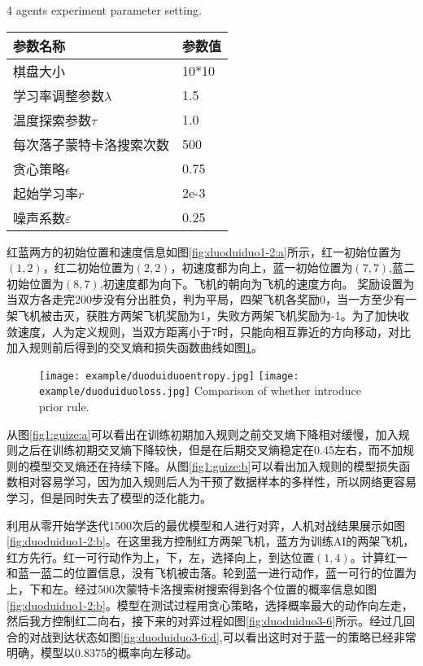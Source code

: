 \begin{table}[htpb]
	\centering
	{4 agents experiment parameter setting.}
	\label{2dui2canshu}
	\begin{tabular}{ll} \toprule
		参数名称   & 参数值  \\  \midrule
		棋盘大小 & 10*10 \\ 
		学习率调整参数$\lambda$ & 1.5 \\  
		温度探索参数$\tau$& 1.0 \\ 
		每次落子蒙特卡洛搜索次数 & 500 \\ 
		贪心策略$\epsilon$ & 0.75 \\  
		起始学习率$r$ & 2e-3\\
		噪声系数$\varepsilon$ &0.25\\
		\bottomrule
	\end{tabular}
\end{table}

红蓝两方的初始位置和速度信息如图\ref{fig:duoduiduo1-2:a}所示，红一初始位置为$(1,2)$，红二初始位置为$(2,2)$，初速度都为向上，蓝一初始位置为$(7,7)$,蓝二初始位置为$(8,7)$,初速度都为向下。飞机的朝向为飞机的速度方向。
奖励设置为当双方各走完200步没有分出胜负，判为平局，四架飞机各奖励0，当一方至少有一架飞机被击灭，获胜方两架飞机奖励为1，失败方两架飞机奖励为-1。为了加快收敛速度，人为定义规则，当双方距离小于7时，只能向相互靠近的方向移动，对比加入规则前后得到的交叉熵和损失函数曲线如图\ref{fig1:guize}。
\begin{figure}[hbpt]
	\centering
	{\texttt{[image: example/duoduiduoentropy.jpg]}}
	\hspace{0.5em}
	{\texttt{[image: example/duoduiduoloss.jpg]}}
	{Comparison of whether introduce prior rule.}
	\label{fig1:guize}
\end{figure}

从图\ref{fig1:guize:a}可以看出在训练初期加入规则之前交叉熵下降相对缓慢，加入规则之后在训练初期交叉熵下降较快，但是在后期交叉熵稳定在0.45左右，而不加规则的模型交叉熵还在持续下降。从图\ref{fig1:guize:b}可以看出加入规则的模型损失函数相对容易学习，因为加入规则后人为干预了数据样本的多样性，所以网络更容易学习，但是同时失去了模型的泛化能力。

利用从零开始学迭代1500次后的最优模型和人进行对弈，人机对战结果展示如图\ref{fig:duoduiduo1-2:b}。在这里我方控制红方两架飞机，蓝方为训练AI的两架飞机，红方先行。红一可行动作为上，下，左，选择向上，到达位置$(1,4)$。计算红一和蓝一蓝二的位置信息，没有飞机被击落。轮到蓝一进行动作，蓝一可行的位置为上，下和左。经过500次蒙特卡洛搜索树搜索得到各个位置的概率信息如图\ref{fig:duoduiduo1-2:b}。模型在测试过程用贪心策略，选择概率最大的动作向左走，然后我方控制红二向右，接下来的对弈过程如图\ref{fig:duoduiduo3-6}所示。经过几回合的对战到达状态如图\ref{fig:duoduiduo3-6:d},可以看出这时对于蓝一的策略已经非常明确，模型以0.8375的概率向左移动。

